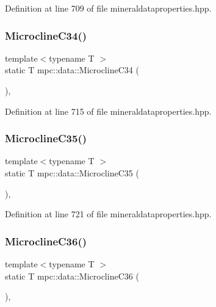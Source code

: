 Definition at line 709 of file mineraldataproperties.\+hpp.

\mbox{\label{namespacempc_1_1data_a1befb374e20df05fd928ae98a159ec53}} 
\subsubsection{\texorpdfstring{Microcline\+C34()}{MicroclineC34()}}
{\footnotesize\ttfamily template$<$typename T $>$ \\
static T mpc\+::data\+::\+Microcline\+C34 (\begin{DoxyParamCaption}{ }\end{DoxyParamCaption})\hspace{0.3cm}{\ttfamily [inline]}, {\ttfamily [static]}}



Definition at line 715 of file mineraldataproperties.\+hpp.

\mbox{\label{namespacempc_1_1data_afc82dd5dfd352863a9dd8a7773c7038a}} 
\subsubsection{\texorpdfstring{Microcline\+C35()}{MicroclineC35()}}
{\footnotesize\ttfamily template$<$typename T $>$ \\
static T mpc\+::data\+::\+Microcline\+C35 (\begin{DoxyParamCaption}{ }\end{DoxyParamCaption})\hspace{0.3cm}{\ttfamily [inline]}, {\ttfamily [static]}}



Definition at line 721 of file mineraldataproperties.\+hpp.

\mbox{\label{namespacempc_1_1data_a886067f6f068bd9da6beccdae4eb6123}} 
\subsubsection{\texorpdfstring{Microcline\+C36()}{MicroclineC36()}}
{\footnotesize\ttfamily template$<$typename T $>$ \\
static T mpc\+::data\+::\+Microcline\+C36 (\begin{DoxyParamCaption}{ }\end{DoxyParamCaption})\hspace{0.3cm}{\ttfamily [inline]}, {\ttfamily [static]}}




